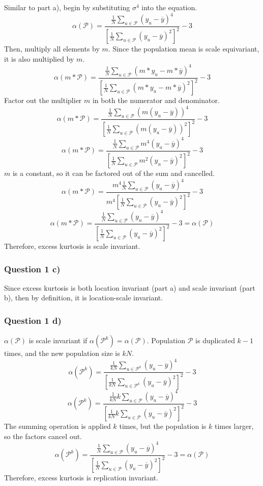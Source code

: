 \documentclass[
]{article}
\begin{document}
Similar to part a), begin by substituting \(\sigma^4\) into the
equation. \[
\alpha(\mathcal{P}) = \frac{\frac{1}{N} \sum_{u \in \mathcal{P}}\left( y_u -\overline{y} \right)^4}{ [\frac{1}{N}\sum_{u \in \mathcal{P}}(y_u-\overline y)^2]^2 }-3
\] Then, multiply all elements by \(m\). Since the population mean is
scale equivariant, it is also multiplied by \(m\). \[
\alpha(m*\mathcal{P}) = \frac{\frac{1}{N} \sum_{u \in \mathcal{P}}\left( m*y_u - m*\overline{y} \right)^4}{ [\frac{1}{N}\sum_{u \in \mathcal{P}}(m*y_u-m*\overline y)^2]^2 }-3
\] Factor out the multiplier \(m\) in both the numerator and
denominator. \[
\alpha(m*\mathcal{P}) = \frac{\frac{1}{N} \sum_{u \in \mathcal{P}}(m\left(y_u - \overline{y} \right))^4}{ [\frac{1}{N}\sum_{u \in \mathcal{P}}(m(y_u-\overline y))^2]^2 }-3
\] \[
\alpha(m*\mathcal{P}) = \frac{\frac{1}{N} \sum_{u \in \mathcal{P}}m^4\left( y_u - \overline{y} \right)^4}{ [\frac{1}{N}\sum_{u \in \mathcal{P}}m^2(y_u-\overline y)^2]^2 }-3
\] \(m\) is a constant, so it can be factored out of the sum and
cancelled. \[
\alpha(m*\mathcal{P}) = \frac{m^4\frac{1}{N} \sum_{u \in \mathcal{P}}\left( y_u - \overline{y} \right)^4}{ m^4[\frac{1}{N}\sum_{u \in \mathcal{P}}(y_u-\overline y)^2]^2 }-3
\] \[
\alpha(m*\mathcal{P}) = \frac{\frac{1}{N} \sum_{u \in \mathcal{P}}\left( y_u - \overline{y} \right)^4}{ [\frac{1}{N}\sum_{u \in \mathcal{P}}(y_u-\overline y)^2]^2 }-3 = \alpha(\mathcal{P})
\] Therefore, excess kurtosis is scale invariant.

\newpage

\hypertarget{question-1-c}{%
\subsubsection{Question 1 c)}\label{question-1-c}}

Since excess kurtosis is both location invariant (part a) and scale
invariant (part b), then by definition, it is location-scale invariant.

\newpage

\hypertarget{question-1-d}{%
\subsubsection{Question 1 d)}\label{question-1-d}}

\(\alpha(\mathcal{P})\) is scale invariant if
\(\alpha(\mathcal{P}^k) = \alpha(\mathcal{P})\). Population
\(\mathcal{P}\) is duplicated \(k-1\) times, and the new population size
is \(kN\). \[
\alpha(\mathcal{P}^k) = \frac{\frac{1}{kN} \sum_{u \in \mathcal{P}^k}\left( y_u -\overline{y} \right)^4}{ [\frac{1}{kN}\sum_{u \in \mathcal{P}^k}(y_u-\overline y)^2]^2 }-3
\] \[
\alpha(\mathcal{P}^k) = \frac{\frac{1}{kN} k\sum_{u \in \mathcal{P}}\left( y_u -\overline{y} \right)^4}{ [\frac{1}{kN}k\sum_{u \in \mathcal{P}}(y_u-\overline y)^2]^2 }-3
\] The summing operation is applied \(k\) times, but the population is
\(k\) times larger, so the factors cancel out. \[
\alpha(\mathcal{P}^k) = \frac{\frac{1}{N} \sum_{u \in \mathcal{P}}\left( y_u -\overline{y} \right)^4}{ [\frac{1}{N}\sum_{u \in \mathcal{P}}(y_u-\overline y)^2]^2 }-3 = \alpha(\mathcal{P})
\] Therefore, excess kurtosis is replication invariant.
\end{document}
